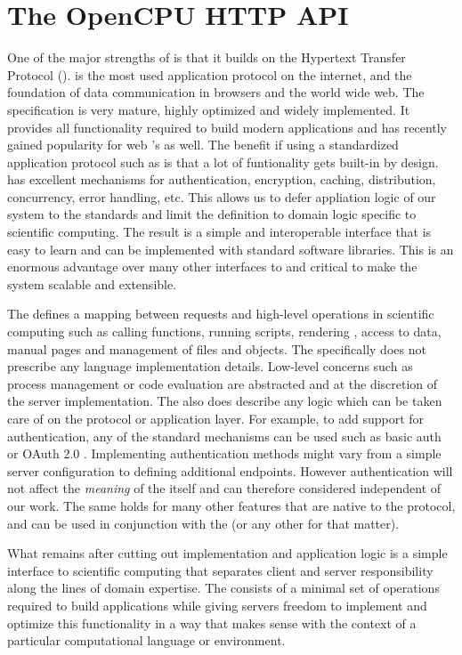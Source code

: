 \section{The OpenCPU HTTP API}

One of the major strengths of \OpenCPU is that it builds on the Hypertext Transfer Protocol (\HTTP). \HTTP is the most used application protocol on the internet, and the foundation of data communication in browsers and the world wide web. The \HTTP specification is very mature, highly optimized and widely implemented. It provides all functionality required to build modern applications and has recently gained popularity for web \API's as well. The benefit if using a standardized application protocol such as \HTTP is that a lot of funtionality gets built-in by design. \HTTP has excellent mechanisms for authentication, encryption, caching, distribution, concurrency, error handling, etc. This allows us to defer appliation logic of our system to the \HTTP standards and limit the \OpenCPU \API definition to domain logic specific to scientific computing. The result is a simple and interoperable interface that is easy to learn and can be implemented with standard \HTTP software libraries. This is an enormous advantage over many other interfaces to \R and critical to make the system scalable and extensible. 

The \OpenCPU \API defines a mapping between \HTTP requests and high-level operations in scientific computing such as calling functions, running scripts, rendering \Latex, access to data, manual pages and management of files and objects. The \API specifically does not prescribe any language implementation details. Low-level concerns such as process management or code evaluation are abstracted and at the discretion of the server implementation. The \API also does describe any logic which can be taken care of on the protocol or application layer. For example, to add support for authentication, any of the standard mechanisms can be used such as \HTTP basic auth \citep{franks1999rfc} or OAuth 2.0 \citep{hardt2012oauth}. Implementing authentication methods might vary from a simple server configuration to defining additional endpoints. However authentication will not affect the \emph{meaning} of the \API itself and can therefore considered independent of our work. The same holds for many other features that are native to the \HTTP protocol, and can be used in conjunction with the \OpenCPU \API (or any other \HTTP \API for that matter). 

What remains after cutting out implementation and application logic is a simple interface to scientific computing that separates client and server responsibility along the lines of domain expertise. The \OpenCPU \API consists of a minimal set of operations required to build applications while giving servers freedom to implement and optimize this functionality in a way that makes sense with the context of a particular computational language or environment. 

